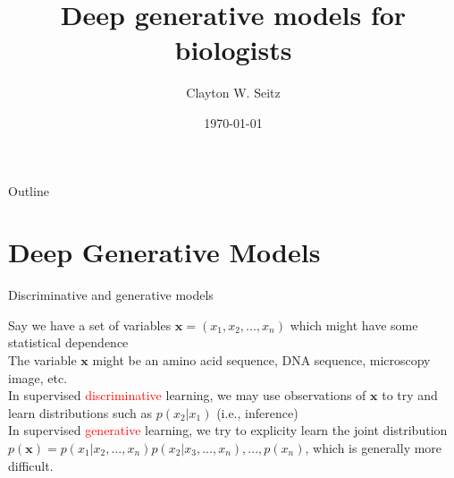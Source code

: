 \documentclass{beamer}					%
\title{Deep generative models for biologists}	%
\author{Clayton W. Seitz}								%
\date{\today}									%
\begin{document}
\begin{frame}
  \titlepage
\end{frame}

\begin{frame}{Outline}
  \tableofcontents
\end{frame}

%


\section{Deep Generative Models}

\begin{frame}{Discriminative and generative models}

Say we have a set of variables $\mathbf{x} = (x_{1},x_{2},...,x_{n})$ which might have some statistical dependence\\
\vspace{0.2in}
The variable $\mathbf{x}$ might be an amino acid sequence, DNA sequence, microscopy image, etc.\\
\vspace{0.2in}
In supervised \textcolor{red}{discriminative} learning, we may use observations of $\mathbf{x}$ to try and learn distributions such as $p(x_{2}|x_{1})$ (i.e., inference)\\
\vspace{0.2in}
In supervised \textcolor{red}{generative} learning, we try to explicity learn the joint distribution $p(\mathbf{x})=p(x_{1}|x_{2},...,x_{n})p(x_{2}|x_{3},...,x_{n}),...,p(x_{n})$, which is generally more difficult. 

\end{frame}
\end{document}

